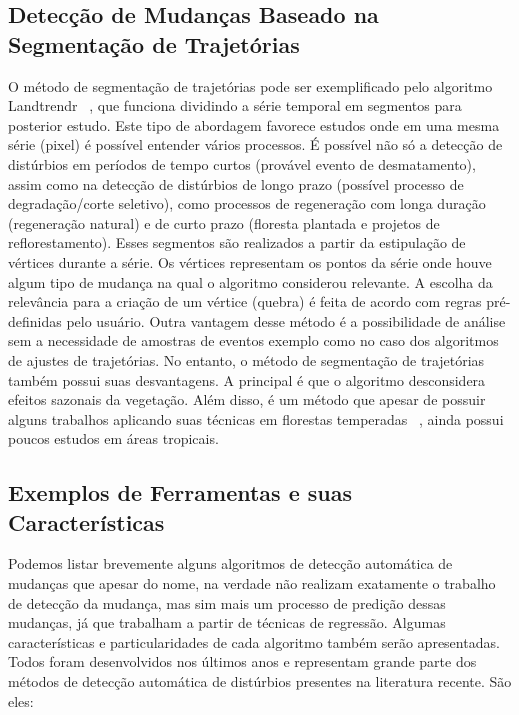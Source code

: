 \documentclass[twocolumn]{article}
\begin{document}
\subsection{Detecção de Mudanças Baseado na Segmentação de Trajetórias}
O método de segmentação de trajetórias pode ser exemplificado pelo algoritmo Landtrendr ~\cite{KENNEDY20102897, KENNEDY2012117}, que funciona dividindo a série temporal em segmentos para posterior estudo. Este tipo de abordagem favorece estudos onde em uma mesma série (pixel) é possível entender vários processos. É possível não só a detecção de distúrbios em períodos de tempo curtos (provável evento de desmatamento), assim como na detecção de distúrbios de longo prazo (possível processo de degradação/corte seletivo), como processos de regeneração com longa duração (regeneração natural) e de curto prazo (floresta plantada e projetos de reflorestamento). Esses segmentos são realizados a partir da estipulação de vértices durante a série. Os vértices representam os pontos da série onde houve algum tipo de mudança na qual o algoritmo considerou relevante. A escolha da relevância para a criação de um vértice (quebra) é feita de acordo com regras pré-definidas pelo usuário. Outra vantagem desse método é a possibilidade de análise sem a necessidade de amostras de eventos exemplo como no caso dos algoritmos de ajustes de trajetórias.
No entanto, o método de segmentação de trajetórias também possui suas desvantagens. A principal é que o algoritmo desconsidera efeitos sazonais da vegetação. Além disso, é um método que apesar de possuir alguns trabalhos aplicando suas técnicas em florestas temperadas ~\cite{PFLUGMACHER2012146, Griffiths2015}, ainda possui poucos estudos em áreas tropicais.

\subsection{Exemplos de Ferramentas e suas Características}
Podemos listar brevemente alguns algoritmos de detecção automática de mudanças que apesar do nome, na verdade não realizam exatamente o trabalho de detecção da mudança, mas sim mais um processo de predição dessas mudanças, já que trabalham a partir de técnicas de regressão. Algumas características e particularidades de cada algoritmo também serão apresentadas. Todos foram desenvolvidos nos últimos anos e representam grande parte dos métodos de detecção automática de distúrbios presentes na literatura recente. São eles:
\end{document}

